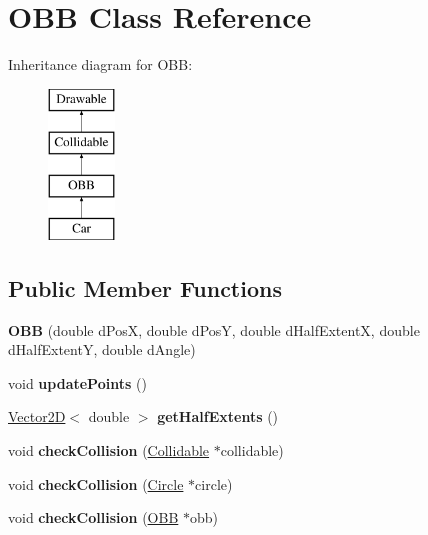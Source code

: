 \hypertarget{class_o_b_b}{}\section{O\+B\+B Class Reference}
\label{class_o_b_b}
Inheritance diagram for O\+B\+B\+:\begin{figure}[H]
\begin{center}
\leavevmode
\includegraphics[height=4.000000cm]{class_o_b_b}
\end{center}
\end{figure}
\subsection*{Public Member Functions}
\begin{DoxyCompactItemize}
\item 
\hypertarget{class_o_b_b_ab736691f196da32e5d29b39cc5f797a9}{}{\bfseries O\+B\+B} (double d\+Pos\+X, double d\+Pos\+Y, double d\+Half\+Extent\+X, double d\+Half\+Extent\+Y, double d\+Angle)\label{class_o_b_b_ab736691f196da32e5d29b39cc5f797a9}

\item 
\hypertarget{class_o_b_b_a3103d775e6ba4b27a80263ea14826309}{}void {\bfseries update\+Points} ()\label{class_o_b_b_a3103d775e6ba4b27a80263ea14826309}

\item 
\hypertarget{class_o_b_b_acb95cc5ca2f703da43444f6a029d117b}{}\hyperlink{class_vector2_d}{Vector2\+D}$<$ double $>$ {\bfseries get\+Half\+Extents} ()\label{class_o_b_b_acb95cc5ca2f703da43444f6a029d117b}

\item 
\hypertarget{class_o_b_b_a2064e40dc401e8c04e3daad5c5aa62d2}{}void {\bfseries check\+Collision} (\hyperlink{class_collidable}{Collidable} $\ast$collidable)\label{class_o_b_b_a2064e40dc401e8c04e3daad5c5aa62d2}

\item 
\hypertarget{class_o_b_b_ab55aa6044004c4ea4e5d8310727569c0}{}void {\bfseries check\+Collision} (\hyperlink{class_circle}{Circle} $\ast$circle)\label{class_o_b_b_ab55aa6044004c4ea4e5d8310727569c0}

\item 
\hypertarget{class_o_b_b_afe394e34d273c0c7b1dfa9a6e28f059f}{}void {\bfseries check\+Collision} (\hyperlink{class_o_b_b}{O\+B\+B} $\ast$obb)\label{class_o_b_b_afe394e34d273c0c7b1dfa9a6e28f059f}

\end{DoxyCompactItemize}
